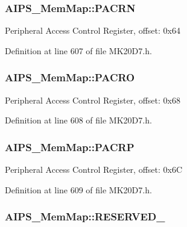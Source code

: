 \subsubsection[{\texorpdfstring{P\+A\+C\+RN}{PACRN}}]{ A\+I\+P\+S\+\_\+\+Mem\+Map\+::\+P\+A\+C\+RN}\hypertarget{struct_a_i_p_s___mem_map_a83bf08b950901b8f6d7ef2ceb960baa8}{}\label{struct_a_i_p_s___mem_map_a83bf08b950901b8f6d7ef2ceb960baa8}
Peripheral Access Control Register, offset\+: 0x64 

Definition at line 607 of file M\+K20\+D7.\+h.

\subsubsection[{\texorpdfstring{P\+A\+C\+RO}{PACRO}}]{ A\+I\+P\+S\+\_\+\+Mem\+Map\+::\+P\+A\+C\+RO}\hypertarget{struct_a_i_p_s___mem_map_a5892f2b025c43f875f1c88e3a8f6da30}{}\label{struct_a_i_p_s___mem_map_a5892f2b025c43f875f1c88e3a8f6da30}
Peripheral Access Control Register, offset\+: 0x68 

Definition at line 608 of file M\+K20\+D7.\+h.

\subsubsection[{\texorpdfstring{P\+A\+C\+RP}{PACRP}}]{ A\+I\+P\+S\+\_\+\+Mem\+Map\+::\+P\+A\+C\+RP}\hypertarget{struct_a_i_p_s___mem_map_af6d96671be0c664042ec003595ac405e}{}\label{struct_a_i_p_s___mem_map_af6d96671be0c664042ec003595ac405e}
Peripheral Access Control Register, offset\+: 0x6C 

Definition at line 609 of file M\+K20\+D7.\+h.

\subsubsection[{\texorpdfstring{R\+E\+S\+E\+R\+V\+E\+D\+\_\+0}{RESERVED_0}}]{ A\+I\+P\+S\+\_\+\+Mem\+Map\+::\+R\+E\+S\+E\+R\+V\+E\+D\+\_}\hypertarget{struct_a_i_p_s___mem_map_a67a1289be7ee7d3975df7d7c831b8819}{}\label{struct_a_i_p_s___mem_map_a67a1289be7ee7d3975df7d7c831b8819}


